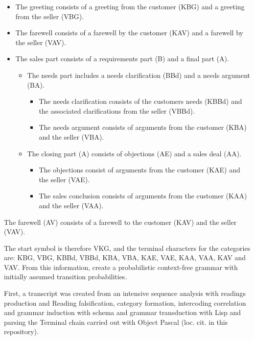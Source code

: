 \documentclass[
]{article}
\begin{document}
\begin{itemize}
\item
  The greeting consists of a greeting from the customer (KBG) and a
  greeting from the seller (VBG).
\item
  The farewell consists of a farewell by the customer (KAV) and a
  farewell by the seller (VAV).
\item
  The sales part consists of a requirements part (B) and a final part
  (A).

  \begin{itemize}
  \item
    The needs part includes a needs clarification (BBd) and a needs
    argument (BA).

    \begin{itemize}
    \item
      The needs clarification consists of the customer\textquotesingle s
      needs (KBBd) and the associated clarifications from the seller
      (VBBd).
    \item
      The needs argument consists of arguments from the customer (KBA)
      and the seller (VBA).
    \end{itemize}
  \item
    The closing part (A) consists of objections (AE) and a sales deal
    (AA).

    \begin{itemize}
    \item
      The objections consist of arguments from the customer (KAE) and
      the seller (VAE).
    \item
      The sales conclusion consists of arguments from the customer (KAA)
      and the seller (VAA).
    \end{itemize}
  \end{itemize}
\end{itemize}

The farewell (AV) consists of a farewell to the customer (KAV) and the
seller (VAV).

The start symbol is therefore VKG, and the terminal characters for the
categories are: KBG, VBG, KBBd, VBBd, KBA, VBA, KAE, VAE, KAA, VAA, KAV
and VAV. From this information, create a probabilistic context-free
grammar with initially assumed transition probabilities.

First, a transcript was created from an intensive sequence analysis with
readings production and Reading falsification, category formation,
intercoding correlation and grammar induction with schema and grammar
transduction with Lisp and parsing the Terminal chain carried out with
Object Pascal (loc. cit. in this repository).
\end{document}
